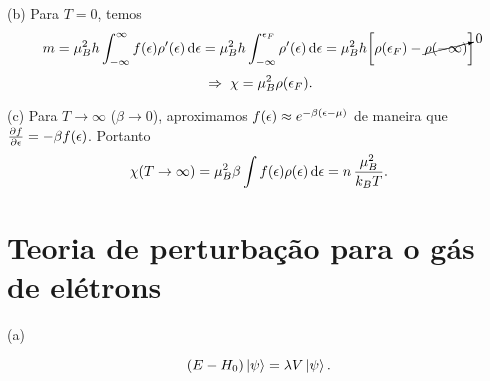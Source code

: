 \documentclass[a4paper,10pt]{article}
\begin{document}
(b) Para $T = 0$, temos
$$
m = \mu_B^2 h \int_{-\infty}^{\infty} f(\epsilon) \rho'(\epsilon) \dd{\epsilon} =
\mu_B^2 h \int_{-\infty}^{\epsilon_F} \rho'(\epsilon) \dd{\epsilon} =
\mu_B^2 h \qty[ \rho(\epsilon_F) - \cancelto{0}{\rho(-\infty)} ]
$$
$$
\; \Rightarrow \; \chi = \mu_B^2 \rho(\epsilon_F).
$$

(c) Para $T \to \infty$ ($\beta \to 0$), aproximamos $f(\epsilon) \approx e^{-\beta(\epsilon - \mu)}$ de maneira que $\pdv{f}{\epsilon} = -\beta f(\epsilon)$. Portanto
$$
\chi(T \to \infty) = \mu_B^2 \beta \int f(\epsilon) \rho(\epsilon) \dd{\epsilon} = n \, \frac{\mu_B^2}{k_B T}.
$$


\pagebreak


\section{Teoria de perturbação para o gás de elétrons}

(a)


\begin{equation} \label{eq:pertub}
(E - H_0) \ket{\psi} = \lambda V \ket{\psi}.
\end{equation}
\end{document}
